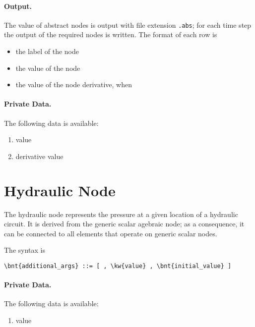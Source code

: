 \paragraph{Output.}
The value of abstract nodes is output with file extension \texttt{.abs}; for
each time step the output of the required nodes is written.
The format of each row is
\begin{itemize}
    \item the label of the node
    \item the value of the node
    \item the value of the node derivative, when 
\end{itemize}

\paragraph{Private Data.}
\label{sec:NODE:ABSTRACT:PRIV}
The following data is available:
\begin{enumerate}
\item {} value
\item {} derivative value
\end{enumerate}



\section{Hydraulic Node}
\label{sec:NODE:HYDRAULIC}
The hydraulic node represents the pressure
at a given location of a hydraulic circuit.
It is derived from the generic scalar agebraic node; as a consequence,
it can be connected to all elements that operate on generic scalar nodes. 

The syntax is
\begin{Verbatim}[commandchars=\\\{\}]
    \bnt{additional_args} ::= [ , \kw{value} , \bnt{initial_value} ]
\end{Verbatim}

\paragraph{Private Data.}
\label{sec:NODE:HYDRAULIC:PRIV}
The following data is available:
\begin{enumerate}
\item {} value
\end{enumerate}



